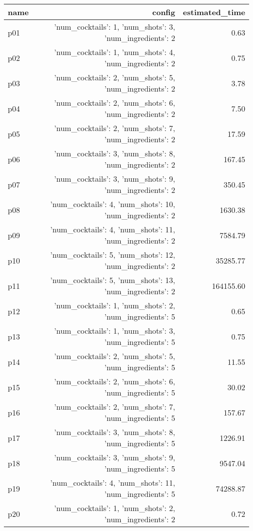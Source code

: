 \documentclass{article}
\begin{document}
                            \begin{center}
                            \scriptsize
                            \begin{tabular}{@{}l|r|r@{}}
                            name & config & estimated\_time\\\midrule
                              p01&{'num\_cocktails': 1, 'num\_shots': 3, 'num\_ingredients': 2}&0.63\\
  p02&{'num\_cocktails': 1, 'num\_shots': 4, 'num\_ingredients': 2}&0.75\\
  p03&{'num\_cocktails': 2, 'num\_shots': 5, 'num\_ingredients': 2}&3.78\\
  p04&{'num\_cocktails': 2, 'num\_shots': 6, 'num\_ingredients': 2}&7.50\\
  p05&{'num\_cocktails': 2, 'num\_shots': 7, 'num\_ingredients': 2}&17.59\\
  p06&{'num\_cocktails': 3, 'num\_shots': 8, 'num\_ingredients': 2}&167.45\\
  p07&{'num\_cocktails': 3, 'num\_shots': 9, 'num\_ingredients': 2}&350.45\\
  p08&{'num\_cocktails': 4, 'num\_shots': 10, 'num\_ingredients': 2}&1630.38\\
  p09&{'num\_cocktails': 4, 'num\_shots': 11, 'num\_ingredients': 2}&7584.79\\
  p10&{'num\_cocktails': 5, 'num\_shots': 12, 'num\_ingredients': 2}&35285.77\\
  p11&{'num\_cocktails': 5, 'num\_shots': 13, 'num\_ingredients': 2}&164155.60\\
  p12&{'num\_cocktails': 1, 'num\_shots': 2, 'num\_ingredients': 5}&0.65\\
  p13&{'num\_cocktails': 1, 'num\_shots': 3, 'num\_ingredients': 5}&0.75\\
  p14&{'num\_cocktails': 2, 'num\_shots': 5, 'num\_ingredients': 5}&11.55\\
  p15&{'num\_cocktails': 2, 'num\_shots': 6, 'num\_ingredients': 5}&30.02\\
  p16&{'num\_cocktails': 2, 'num\_shots': 7, 'num\_ingredients': 5}&157.67\\
  p17&{'num\_cocktails': 3, 'num\_shots': 8, 'num\_ingredients': 5}&1226.91\\
  p18&{'num\_cocktails': 3, 'num\_shots': 9, 'num\_ingredients': 5}&9547.04\\
  p19&{'num\_cocktails': 4, 'num\_shots': 11, 'num\_ingredients': 5}&74288.87\\
  p20&{'num\_cocktails': 1, 'num\_shots': 2, 'num\_ingredients': 2}&0.72\\

\end{tabular}
\end{center}
\end{document}
